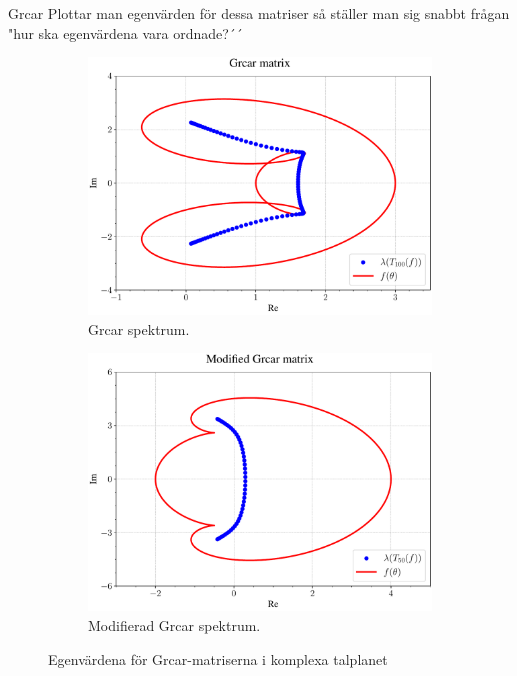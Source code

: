 \documentclass{beamer}
\begin{document}
\begin{frame}{Grcar}
    Plottar man egenvärden för dessa matriser så ställer man sig snabbt frågan "hur ska egenvärdena vara ordnade?´´
    \begin{figure}[H]
    \centering
    \begin{subfigure}{0.49\textwidth}
        \includegraphics[width=\textwidth]{images/Grcar_comp.pdf}
        \caption{Grcar spektrum.}
        \label{fig:Grcar spectrum1}
    \end{subfigure}
    \hfill
    \begin{subfigure}{0.49\textwidth}
        \includegraphics[width=\textwidth]{images/modifiedgrcar1comp.pdf}
        \caption{Modifierad Grcar spektrum.}
        \label{fig:Grcar spectrum2}
    \end{subfigure}
    \caption{Egenvärdena för Grcar-matriserna i komplexa talplanet}
    \label{fig:Grcar spektrum}
    \end{figure}
\end{frame}
\end{document}
